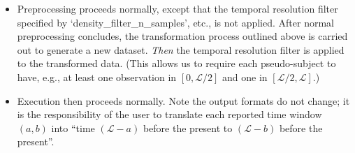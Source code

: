 \documentclass[12pt]{article}
\begin{document}
\begin{itemize}
\item Preprocessing proceeds normally, except that the temporal
  resolution filter specified by `density\_filter\_n\_samples', etc.,
  is not applied. After normal preprocessing concludes, the
  transformation process outlined above is carried out to generate a
  new dataset.  \textit{Then} the temporal resolution filter is
  applied to the transformed data. (This allows us to require
  each pseudo-subject to have, e.g., at least one observation in $[0,
    \mathcal L/2]$ and one in $[\mathcal L/2, \mathcal L]$.)

\item Execution then proceeds normally. Note the output formats do
  not change; it is the responsibility of the user to translate each
  reported time window $(a,b)$ into ``time $(\mathcal L-a)$ before the
  present to $(\mathcal L-b)$ before the present''.
\end{itemize}

\end{document}
